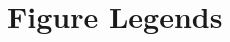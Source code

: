 \documentclass[11pt]{article}
\begin{document}


\clearpage

\section{Figure Legends}
\end{document}

